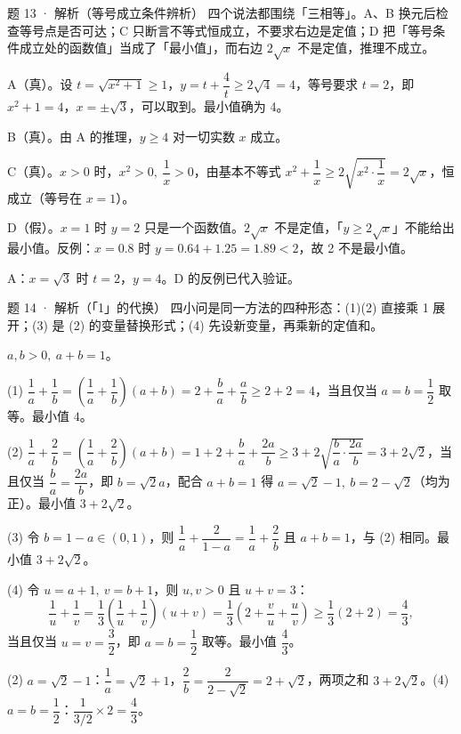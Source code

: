 \begin{solution}{题 13 · 解析（等号成立条件辨析）}
\think 四个说法都围绕「三相等」。A、B 换元后检查等号点是否可达；C 只断言不等式恒成立，不要求右边是定值；D 把「等号条件成立处的函数值」当成了「最小值」，而右边 $2\sqrt x$ 不是定值，推理不成立。

\solve A（真）。设 $t=\sqrt{x^2+1}\ge 1$，$y=t+\dfrac4t\ge 2\sqrt4=4$，等号要求 $t=2$，即 $x^2+1=4$，$x=\pm\sqrt3$，可以取到。最小值确为 4。

B（真）。由 A 的推理，$y\ge 4$ 对一切实数 $x$ 成立。

C（真）。$x>0$ 时，$x^2>0,\ \dfrac1x>0$，由基本不等式 $x^2+\dfrac1x\ge 2\sqrt{x^2\cdot\dfrac1x}=2\sqrt x$，恒成立（等号在 $x=1$）。

D（假）。$x=1$ 时 $y=2$ 只是一个函数值。$2\sqrt x$ 不是定值，「$y\ge 2\sqrt x$」不能给出最小值。反例：$x=0.8$ 时 $y=0.64+1.25=1.89<2$，故 2 不是最小值。

\checkup A：$x=\sqrt3$ 时 $t=2$，$y=4$。D 的反例已代入验证。

\end{solution}

\begin{solution}{题 14 · 解析（「1」的代换）}
\think 四小问是同一方法的四种形态：(1)(2) 直接乘 1 展开；(3) 是 (2) 的变量替换形式；(4) 先设新变量，再乘新的定值和。

\solve $a,b>0,\ a+b=1$。

(1) $\dfrac1a+\dfrac1b=\left(\dfrac1a+\dfrac1b\right)(a+b)=2+\dfrac ba+\dfrac ab\ge 2+2=4$，当且仅当 $a=b=\dfrac12$ 取等。最小值 $4$。

(2) $\dfrac1a+\dfrac2b=\left(\dfrac1a+\dfrac2b\right)(a+b)=1+2+\dfrac ba+\dfrac{2a}{b}\ge 3+2\sqrt{\dfrac ba\cdot\dfrac{2a}b}=3+2\sqrt2$，当且仅当 $\dfrac ba=\dfrac{2a}b$，即 $b=\sqrt2 a$，配合 $a+b=1$ 得 $a=\sqrt2-1,\ b=2-\sqrt2$（均为正）。最小值 $3+2\sqrt2$。

(3) 令 $b=1-a\in(0,1)$，则 $\dfrac1a+\dfrac{2}{1-a}=\dfrac1a+\dfrac2b$ 且 $a+b=1$，与 (2) 相同。最小值 $3+2\sqrt2$。

(4) 令 $u=a+1,\ v=b+1$，则 $u,v>0$ 且 $u+v=3$：
\[
\frac1u+\frac1v=\frac13\left(\frac1u+\frac1v\right)(u+v)=\frac13\left(2+\frac vu+\frac uv\right)\ge\frac13(2+2)=\frac43,
\]
当且仅当 $u=v=\dfrac32$，即 $a=b=\dfrac12$ 取等。最小值 $\dfrac43$。

\checkup (2) $a=\sqrt2-1$：$\dfrac1a=\sqrt2+1$，$\dfrac2b=\dfrac{2}{2-\sqrt2}=2+\sqrt2$，两项之和 $3+2\sqrt2$。(4) $a=b=\dfrac12$：$\dfrac{1}{3/2}\times2=\dfrac43$。

\end{solution}

